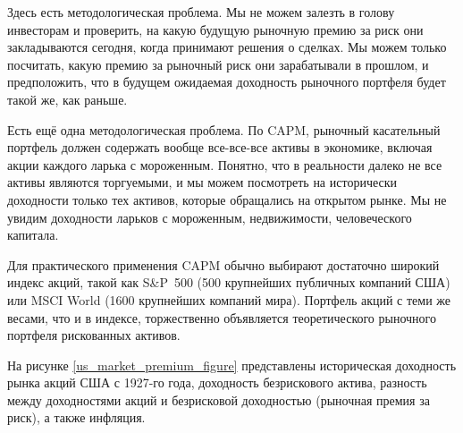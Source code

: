 Здесь есть методологическая проблема. Мы не можем залезть в голову инвесторам и 
проверить, на какую будущую рыночную премию за риск они закладываются сегодня, 
когда принимают решения о сделках. Мы можем только посчитать, какую премию за 
рыночный риск они зарабатывали в прошлом, и предположить, что в будущем 
ожидаемая доходность рыночного портфеля будет такой же, как раньше.

Есть ещё одна методологическая проблема. По CAPM, рыночный касательный портфель 
должен содержать вообще все-все-все активы в экономике, включая акции каждого 
ларька с мороженным. Понятно, что в реальности далеко не все активы являются 
торгуемыми, и мы можем посмотреть на исторически доходности только тех активов, 
которые обращались на открытом рынке. Мы не увидим доходности ларьков с 
мороженным, недвижимости, человеческого капитала.

Для практического применения CAPM обычно выбирают достаточно широкий индекс 
акций, такой как S\&P~500 (500 крупнейших публичных компаний США) или MSCI World 
(1600 крупнейших компаний мира). Портфель акций с теми же весами, что и в 
индексе, торжественно объявляется  теоретического 
рыночного портфеля рискованных активов.

На рисунке \ref{us_market_premium_figure} представлены историческая доходность 
рынка акций США с 1927-го года, доходность безрискового актива, разность между 
доходностями акций и безрисковой доходностью (рыночная премия за риск), а также 
инфляция.

